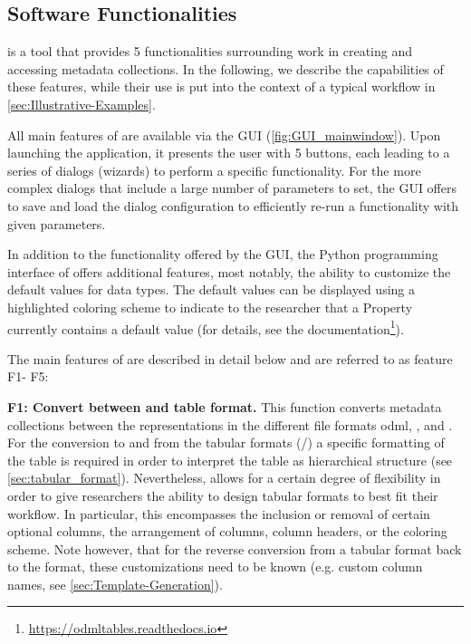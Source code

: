 \subsection{Software Functionalities}
\label{sec:software_functionalities} 

 is a tool that provides 5 functionalities surrounding work in creating and accessing metadata collections. In the following, we describe the capabilities of these features, while their use is put into the context of a typical workflow in \cref{sec:Illustrative-Examples}.

All main features of  are available via the  GUI (\cref{fig:GUI_mainwindow}). Upon launching the application, it presents the user with 5 buttons, each leading to a series of dialogs (wizards) to perform a specific  functionality. For the more complex dialogs that include a large number of parameters to set, the GUI offers to save and load the dialog configuration to efficiently re-run a functionality with given parameters. 

In addition to the functionality offered by the GUI, the Python programming interface of  offers additional features, most notably, the ability to customize the default values for  data types. The default values can be displayed using a highlighted coloring scheme to indicate to the researcher that a Property currently contains a default value (for details, see the  documentation\footnote{\url{https://odmltables.readthedocs.io}}).

\def\fconvert{F1}
\def\fgenerate{F2} 
\def\fcompare{F3}
\def\fmerge{F4}
\def\ffilter{F5} 

The main features of  are described in detail below and are referred to as feature \fconvert - \ffilter:


\textbf{\fconvert: Convert between  and table format.}
This function converts metadata collections between the representations in the different file formats odml, , and . For the conversion to and from the tabular formats (/) a specific formatting of the table is required in order to interpret the table as hierarchical  structure (see \cref{sec:tabular_format}). Nevertheless,  allows for a certain degree of flexibility in order to give researchers the ability to design tabular formats to best fit their workflow. In particular, this encompasses the inclusion or removal of certain optional columns, the arrangement of columns, column headers, or the coloring scheme. Note however, that for the reverse conversion from a tabular format back to the  format, these customizations need to be known (e.g. custom column names, see \cref{sec:Template-Generation}).

